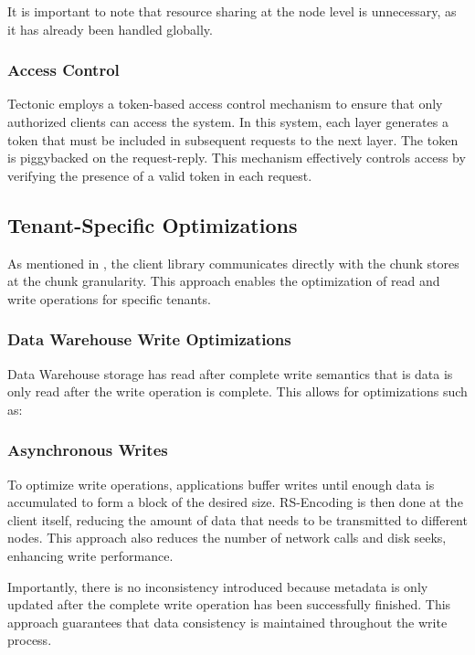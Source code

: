 It is important to note that resource sharing at the node level is unnecessary, as it has already been handled globally.

\subsubsection{Access Control}\label{sec:access_control}

Tectonic employs a token-based access control mechanism to ensure that only authorized clients can access the system. In this system, each layer generates a token that must be included in subsequent requests to the next layer. The token is piggybacked on the request-reply. This mechanism effectively controls access by verifying the presence of a valid token in each request.

\subsection{Tenant-Specific Optimizations}\label{sec:tenant_specific_optimizations}

As mentioned in , the client library communicates directly with the chunk stores at the chunk granularity. This approach enables the optimization of read and write operations for specific tenants.

\subsubsection{Data Warehouse Write Optimizations}\label{sec:data_warehouse_optimization}

Data Warehouse storage has read after complete write semantics that is data is only read after the write operation is complete. This allows for optimizations such as: 

\subsubsection*{Asynchronous Writes}\label{sec:asynchronous_writes}

To optimize write operations, applications buffer writes until enough data is accumulated to form a block of the desired size. RS-Encoding is then done at the client itself, reducing the amount of data that needs to be transmitted to different nodes. This approach also reduces the number of network calls and disk seeks, enhancing write performance.

Importantly, there is no inconsistency introduced because metadata is only updated after the complete write operation has been successfully finished. This approach guarantees that data consistency is maintained throughout the write process.

